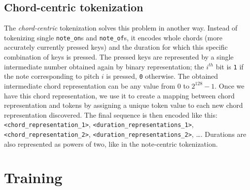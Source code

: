 \subsection{Chord-centric tokenization}\label{subsec:chord-centric-tokenization}

The \textit{chord-centric} tokenization solves this problem in another way.
Instead of tokenizing single \texttt{note\_on}s and \texttt{note\_of}s, it encodes whole chords (more accurately currently pressed keys) and the duration for which this specific combination of keys is pressed.
The pressed keys are represented by a single intermediate number obtained again by binary representation;
the $i^{th}$ bit is \texttt{1} if the note corresponding to pitch $i$ is pressed, \texttt{0} otherwise.
The obtained intermediate chord representation can be any value from $0$ to $2^{128} - 1$.
Once we have this chord representation, we use it to create a mapping between chord representation and tokens by assigning a unique token value to each new chord representation discovered.
The final sequence is then encoded like this: \texttt{<chord\_representation\_1>}, \texttt{<duration\_representations\_1>}, \texttt{<chord\_representation\_2>}, \texttt{<duration\_representations\_2>}, \ldots .
Durations are also represented as powers of two, like in the note-centric tokenization.


\section{Training}\label{sec:training}

